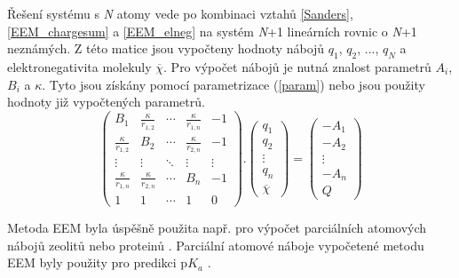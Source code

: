 Řešení systému s \textit{N} atomy vede po kombinaci vztahů  \ref{Sanders}, \ref{EEM_chargesum} a \ref{EEM_elneg} na systém \textit{N}+1 lineárních rovnic o \textit{N}+1 neznámých. Z této matice jsou vypočteny hodnoty nábojů $q_1$, $q_2$, ..., $q_N$ a elektronegativita molekuly $\overline{\chi}$. Pro výpočet nábojů je nutná znalost parametrů $A_i$, $B_i$ a $\kappa$. Tyto jsou získány pomocí parametrizace (\ref{param}) nebo jsou použity hodnoty již vypočtených parametrů. 
\begin{equation}
\label{EEM_matrix}
 \begin{pmatrix}
  B_{1} & \frac{\kappa}{r_{1,2}} & \cdots & \frac{\kappa}{r_{1,n}} & -1\\
  \frac{\kappa}{r_{1,2}} & B_{2} & \cdots & \frac{\kappa}{r_{2,n}} & -1 \\
  \vdots  & \vdots  & \ddots & \vdots & \vdots  \\
  \frac{\kappa}{r_{1,n}} & \frac{\kappa}{r_{2,n}} & \cdots & B_{n} & -1 \\
  1 & 1 & \cdots & 1 & 0
 \end{pmatrix} .
 \begin{pmatrix}
 q_{1} \\ q_{2} \\ \vdots \\ q_{n} \\ \overline{\chi}
 \end{pmatrix} =
 \begin{pmatrix}
 -A_{1} \\ -A_{2} \\ \vdots \\ -A_{n} \\ Q
 \end{pmatrix}
\end{equation}

Metoda EEM byla úspěšně použita např. pro výpočet parciálních atomových nábojů zeolitů \cite{zeolites} nebo proteinů \cite{eem_protein}. Parciální atomové náboje vypočetené metodu EEM byly použity pro predikci p$K_a$ \cite{QSPR2}.


